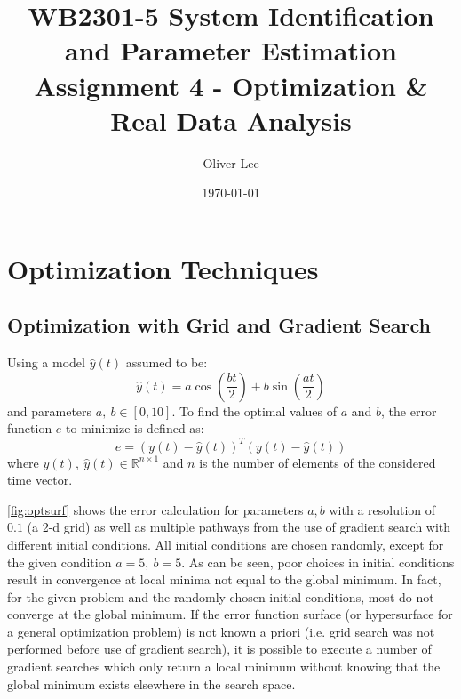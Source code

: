 \documentclass[11pt,a4paper]{article}
\title{WB2301-5 System Identification and Parameter Estimation \\
Assignment 4 - Optimization \& Real Data Analysis}
\author{Oliver Lee}
\date{\today}
\begin{document}
\maketitle

\section{Optimization Techniques}

\subsection{Optimization with Grid and Gradient Search}
Using a model $ \hat{y}(t) $ assumed to be:
\begin{equation*}
    \hat{y}(t) = a\cos(\frac{bt}{2}) + b\sin(\frac{at}{2})
\end{equation*}
and parameters $ a,\: b \in [0, 10] $. To find the optimal values of $a$ and $b$,
the error function $e$ to minimize is defined as:
\begin{equation*}
    e = (y(t) - \hat{y}(t))^T (y(t) - \hat{y}(t))
\end{equation*}
where $y(t),\: \hat{y}(t) \in \mathbb{R}^{n \times 1} $ and $n$ is the number
of elements of the considered time vector.

\autoref{fig:optsurf} shows the error calculation for parameters $a, b$ with a
resolution of $0.1$ (a 2-d grid) as well as multiple pathways from the use of
gradient search with different initial conditions. All initial conditions are
chosen randomly, except for the given condition $a = 5, \: b = 5$. As can be
seen, poor choices in initial conditions result in convergence at local minima
not equal to the global minimum. In fact, for the given problem and the
randomly chosen initial conditions, most do not converge at the global minimum.
If the error function surface (or hypersurface for a general optimization
problem) is not known a priori (i.e. grid search was not performed before use
of gradient search), it is possible to execute a number of gradient searches
which only return a local minimum without knowing that the global minimum
exists elsewhere in the search space.
\end{document}
